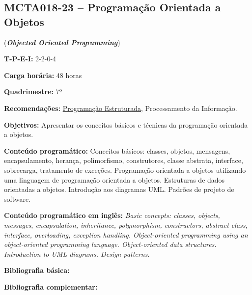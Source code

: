 \documentclass[class=article, crop=false]{standalone}
\begin{document}
\subsection{MCTA018-23 -- Programação Orientada a Objetos}
\label{disc:poo}

(\textbf{\textit{Objected Oriented Programming}})

\begin{center}
    \begin{minipage}{0.85\textwidth}
        \textbf{T-P-E-I:} 2-2-0-4
    
        \textbf{Carga horária:} 48 horas
        
        \textbf{Quadrimestre:} 7º
        
        \textbf{Recomendações:}
        \hyperref[disc:pe]{Programação Estruturada},
        Processamento da Informação.
    \end{minipage}
\end{center}

\textbf{Objetivos:}
Apresentar os conceitos básicos e técnicas da programação orientada a objetos.

\textbf{Conteúdo programático:}
Conceitos básicos: classes, objetos, mensagens, encapsulamento, herança,
polimorfismo, construtores, classe abstrata, interface, sobrecarga, tratamento
de exceções. 
Programação orientada a objetos utilizando uma linguagem de programação
orientada a objetos. 
Estruturas de dados orientadas a objetos. 
Introdução aos diagramas UML. 
Padrões de projeto de software.

\textbf{Conteúdo programático em inglês:}
\textit{Basic concepts: classes, objects, messages, encapsulation, inheritance,
polymorphism, constructors, abstract class, interface, overloading, exception handling.
Object-oriented programming using an object-oriented programming language.
Object-oriented data structures.
Introduction to UML diagrams.
Design patterns.}

\newrefsection
\textbf{Bibliografia básica:}
\nocite{2005-booch, 2007-larman, 2000-gamma}
\printbibliography

\newrefsection
\textbf{Bibliografia complementar:}
\nocite{2016-meyers, 2015-ramalho, 2010-silva, 2006-flanagan, 2009-guedes}
\printbibliography
\end{document}
